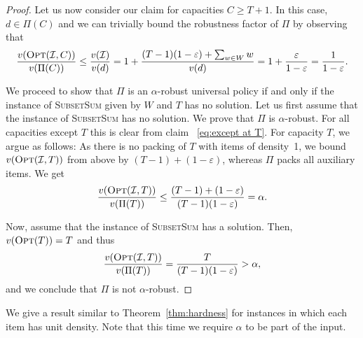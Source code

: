 \documentclass[11pt]{article}
\newcommand{\opt}{\textsc{Opt}}
\newcommand{\OPT}{\opt}
\newcommand{\I}{\mathcal{I}}
\renewcommand{\epsilon}{\varepsilon}
\begin{document}
\begin{proof}
Let us now consider our claim for capacities $C\geq T+1$. In this
case, $d\in\Pi(C)$ and we can trivially bound the robustness factor
of $\Pi$ by observing that
\[
\frac{v(\OPT(\I,C))}{v(\Pi(C))}\leq\frac{v(\I)}{v(d)}=1+\frac{(T-1)(1-\epsilon)+\sum_{w\in
W}w}{v(d)}=1+\frac{\epsilon}{1-\epsilon}=\frac{1}{1-\epsilon}.
\]
 

We proceed to show that $\Pi$ is an $\alpha$-robust universal policy
if and only if the instance of \textsc{SubsetSum} given by $W$ and
$T$ has no solution. Let us first assume that the instance of \textsc{SubsetSum}
has no solution. We prove that $\Pi$ is $\alpha$-robust. For all
capacities except $T$ this is clear from claim~ \eqref{eq:except at T}.
For capacity $T$, we argue as follows: As there is no packing of
$T$ with items of density~1, we bound $v(\OPT(\I,T))$ from above
by $(T-1)+(1-\epsilon)$, whereas $\Pi$ packs all auxiliary items.
We get 
\[
\frac{v(\OPT(\I,T))}{v(\Pi(T))}\leq\frac{(T-1)+(1-\epsilon)}{(T-1)(1-\epsilon)}=\alpha.
\]


Now, assume that the instance of \textsc{SubsetSum} has a solution.
Then, $v(\OPT(T))=T$ and thus 
\begin{align*}
\frac{v(\OPT(\I,T))}{v(\Pi(T))}=\frac{T}{(T-1)(1-\epsilon)}>\alpha,
\end{align*}
and we conclude that $\Pi$ is not $\alpha$-robust. 
\end{proof}

We give a result similar to Theorem~\ref{thm:hardness} for instances in which each item has unit
density. Note that this time we require $\alpha$ to be part of
the input.

\pagebreak
\end{document}
